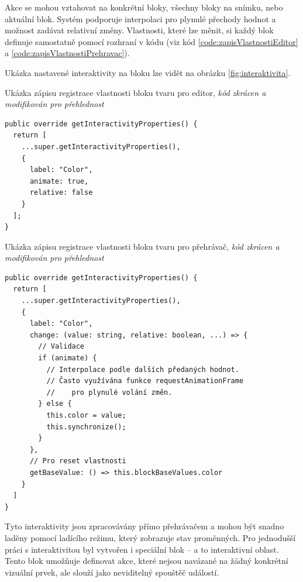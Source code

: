 Akce se mohou vztahovat na konkrétní bloky, všechny bloky na snímku, nebo aktuální blok. 
Systém podporuje interpolaci pro plynulé přechody hodnot a možnost zadávat relativní změny.
Vlastnosti, které lze měnit, si každý blok definuje samostatně pomocí rozhraní v kódu (viz kód \ref{code:zapisVlastnostiEditor} a \ref{code:zapisVlastnostiPrehravac}).

Ukázka nastavené interaktivity na bloku lze vidět na obrázku \ref{fig:interaktivita}.

\begin{listing}[ht!]
\caption[Ukázka zápisu registrace vlastnosti bloku tvaru pro editor]{Ukázka zápisu registrace vlastnosti bloku tvaru pro editor, \textit{kód zkrácen a modifikován pro přehlednost}}\label{code:zapisVlastnostiEditor}
\begin{verbatim}
public override getInteractivityProperties() {
  return [
    ...super.getInteractivityProperties(),
    {
      label: "Color",
      animate: true,
      relative: false
    }
  ];
}
\end{verbatim}
\end{listing}



\begin{listing}[ht!]
\caption[Ukázka zápisu registrace vlastnosti bloku tvaru pro přehrávač]{Ukázka zápisu registrace vlastnosti bloku tvaru pro přehrávač, \textit{kód zkrácen a modifikován pro přehlednost}}\label{code:zapisVlastnostiPrehravac}
\begin{verbatim}
public override getInteractivityProperties() {
  return [
    ...super.getInteractivityProperties(),
    {
      label: "Color",
      change: (value: string, relative: boolean, ...) => {
        // Validace
        if (animate) {
          // Interpolace podle dalších předaných hodnot.
          // Často využívána funkce requestAnimationFrame
          //    pro plynulé volání změn.
        } else {
          this.color = value;
          this.synchronize();
        }
      },
      // Pro reset vlastnosti
      getBaseValue: () => this.blockBaseValues.color
    }
  ]
}
\end{verbatim}
\end{listing}

Tyto interaktivity jsou zpracovávány přímo přehrávačem a mohou být snadno laděny pomocí ladícího režimu, který zobrazuje stav proměnných. 
Pro jednodušší práci s interaktivitou byl vytvořen i speciální blok -- a to interaktivní oblast.
Tento blok umožňuje definovat akce, které nejsou navázané na žádný konkrétní vizuální prvek, ale slouží jako neviditelný spouštěč událostí.


